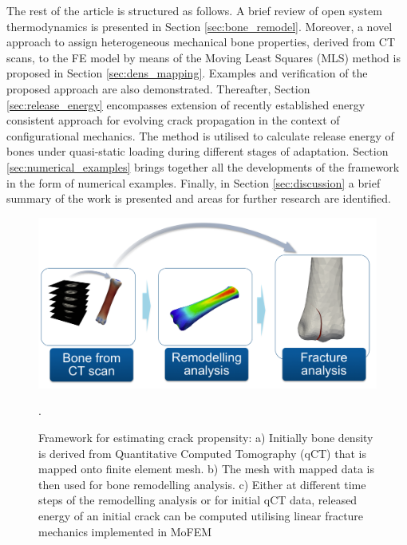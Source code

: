 \documentclass[11pt]{ACMEarticle}
\numberwithin{equation}{section}
\begin{document}
The rest of the article is structured as follows.
A brief review of open system thermodynamics is presented in Section \ref{sec:bone_remodel}.
Moreover, a novel approach to assign heterogeneous mechanical bone properties, derived from CT scans,
to the FE model by means of the Moving Least Squares (MLS) method is proposed in Section \ref{sec:dens_mapping}.
Examples and verification of the proposed approach are also demonstrated. 
Thereafter, Section \ref{sec:release_energy} encompasses extension of recently established energy consistent approach 
for evolving crack propagation in the context of configurational mechanics. 
The method is utilised to calculate release energy of bones under quasi-static loading during different stages of adaptation. 
Section \ref{sec:numerical_examples} brings together all the developments of the framework in the form of numerical examples. 
Finally, in Section \ref{sec:discussion} a brief summary of the work is presented and areas for further research are identified.
\begin{figure}[h!]
	\begin{centering}
		\includegraphics[width=12cm]{Figures/framework}
		\caption{Framework for estimating crack propensity: 
		a) Initially bone density is derived from Quantitative Computed Tomography (qCT) that is mapped onto finite element mesh. 
		b) The mesh with mapped data is then used for bone remodelling analysis. 
		c) Either at different time steps of the remodelling analysis or for initial qCT data, released energy of an initial crack can be 
		computed utilising linear fracture mechanics \citep{kaczmarczyk2014three,kaczmarczyk2017energy} implemented in MoFEM \citep{mofem2017}}.
		\label{fig:framework}
	\end{centering}
\end{figure}
\end{document}
